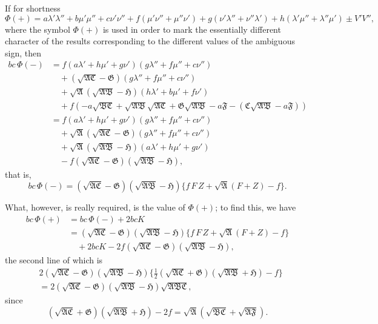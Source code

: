 \documentclass[11pt]{article}
\begin{document}
If for shortness
\[
\Phi(+) = a\lambda'\lambda''+b\mu'\mu''+c\nu'\nu''+f(\mu'\nu''+\mu''\nu')+g(\nu'\lambda''+\nu''\lambda')+h(\lambda'\mu''+\lambda''\mu') \pm V'V'',
\]
where the symbol $\Phi(+)$ is used in order to mark the essentially different character of the results corresponding to the different values of the ambiguous sign, then
\begin{align*}
bc\,\Phi(-) &= f(a\lambda'+h\mu'+g\nu')(g\lambda''+f\mu''+c\nu'')\\
&\quad + (\sqrt{\mathfrak{A}\mathfrak{C}}-\mathfrak{G})(g\lambda''+f\mu''+c\nu'')\\
&\quad + \sqrt{\mathfrak{A}}(\sqrt{\mathfrak{A}\mathfrak{B}}-\mathfrak{H})(h\lambda'+b\mu'+f\nu')\\
&\quad + f(-a\sqrt{\mathfrak{B}\mathfrak{C}}+\sqrt{\mathfrak{A}\mathfrak{B}}\sqrt{\mathfrak{A}\mathfrak{C}}+\mathfrak{G}\sqrt{\mathfrak{A}\mathfrak{B}}-a\mathfrak{F}-(\mathfrak{C}\sqrt{\mathfrak{A}\mathfrak{B}}-a\mathfrak{F}))\\
&= f(a\lambda'+h\mu'+g\nu')(g\lambda''+f\mu''+c\nu'')\\
&\quad + \sqrt{\mathfrak{A}}(\sqrt{\mathfrak{A}\mathfrak{C}}-\mathfrak{G})(g\lambda''+f\mu''+c\nu'')\\
&\quad + \sqrt{\mathfrak{A}}(\sqrt{\mathfrak{A}\mathfrak{B}}-\mathfrak{H})(a\lambda'+h\mu'+g\nu')\\
&\quad - f(\sqrt{\mathfrak{A}\mathfrak{C}}-\mathfrak{G})(\sqrt{\mathfrak{A}\mathfrak{B}}-\mathfrak{H}),
\end{align*}
that is,
\[
bc\,\Phi(-) = (\sqrt{\mathfrak{A}\mathfrak{C}}-\mathfrak{G})(\sqrt{\mathfrak{A}\mathfrak{B}}-\mathfrak{H})\{f\,F\,Z + \sqrt{\mathfrak{A}}(F+Z)-f\}.
\]

What, however, is really required, is the value of $\Phi(+)$; to find this, we have
\begin{align*}
bc\,\Phi(+) &= bc\,\Phi(-) + 2bcK\\
&= (\sqrt{\mathfrak{A}\mathfrak{C}}-\mathfrak{G})(\sqrt{\mathfrak{A}\mathfrak{B}}-\mathfrak{H})\{f\,F\,Z + \sqrt{\mathfrak{A}}(F+Z)-f\}\\
&\quad + 2bcK - 2f(\sqrt{\mathfrak{A}\mathfrak{C}}-\mathfrak{G})(\sqrt{\mathfrak{A}\mathfrak{B}}-\mathfrak{H}),
\end{align*}
the second line of which is
\begin{align*}
&2(\sqrt{\mathfrak{A}\mathfrak{C}}-\mathfrak{G})(\sqrt{\mathfrak{A}\mathfrak{B}}-\mathfrak{H})\{\tfrac{1}{2}(\sqrt{\mathfrak{A}\mathfrak{C}}+\mathfrak{G})(\sqrt{\mathfrak{A}\mathfrak{B}}+\mathfrak{H})-f\}\\
&= 2(\sqrt{\mathfrak{A}\mathfrak{C}}-\mathfrak{G})(\sqrt{\mathfrak{A}\mathfrak{B}}-\mathfrak{H})\sqrt{\mathfrak{A}\mathfrak{B}\mathfrak{C}},
\end{align*}
since
\[
(\sqrt{\mathfrak{A}\mathfrak{C}}+\mathfrak{G})(\sqrt{\mathfrak{A}\mathfrak{B}}+\mathfrak{H}) - 2f = \sqrt{\mathfrak{A}}(\sqrt{\mathfrak{B}\mathfrak{C}}+\sqrt{\mathfrak{A}\mathfrak{F}}).
\]
\end{document}
